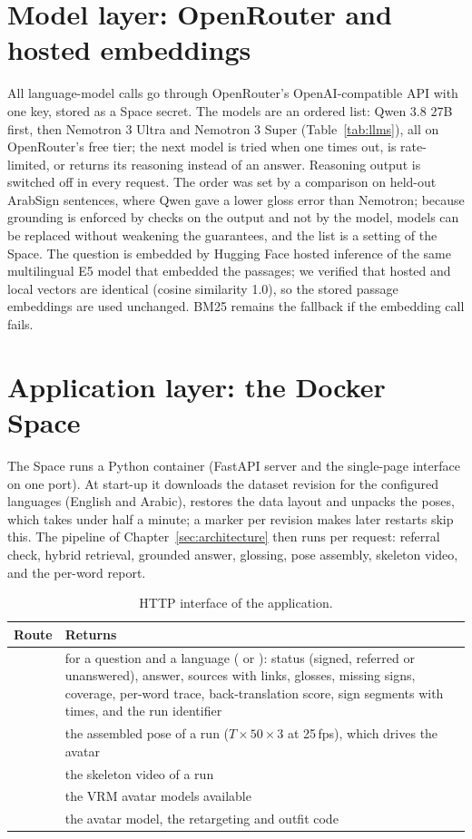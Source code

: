 \section{Model layer: OpenRouter and hosted embeddings}
All language-model calls go through OpenRouter's OpenAI-compatible API with one key, stored as a Space secret. The models
are an ordered list: Qwen 3.8 27B first, then Nemotron 3 Ultra and Nemotron 3 Super (Table~\ref{tab:llms}), all on
OpenRouter's free tier; the next model is tried when one times out, is rate-limited, or returns its reasoning instead of an
answer. Reasoning output is switched off in every request. The order was set by a comparison on held-out ArabSign
sentences, where Qwen gave a lower gloss error than Nemotron; because grounding is enforced by checks on the output and not
by the model, models can be replaced without weakening the guarantees, and the list is a setting of the Space. The question
is embedded by Hugging Face hosted inference of the same multilingual E5 model that embedded the passages; we verified that
hosted and local vectors are identical (cosine similarity 1.0), so the stored passage embeddings are used unchanged. BM25
remains the fallback if the embedding call fails.

\section{Application layer: the Docker Space}
The Space runs a Python container (FastAPI server and the single-page interface on one port). At start-up it downloads the
dataset revision for the configured languages (English and Arabic), restores the data layout and unpacks the poses, which
takes under half a minute; a marker per revision makes later restarts skip this. The pipeline of
Chapter~\ref{sec:architecture} then runs per request: referral check, hybrid retrieval, grounded answer, glossing, pose
assembly, skeleton video, and the per-word report.

\begin{table}[ht]
\centering\small
\caption{HTTP interface of the application.}
\label{tab:api}
\begin{tabularx}{\textwidth}{L{3.6cm} Y}
\toprule
Route & Returns \\
\midrule
{} & for a question and a language ( or ): status (signed, referred or unanswered),
answer, sources with links, glosses, missing signs, coverage, per-word trace, back-translation score, sign segments with
times, and the run identifier \\
 & the assembled pose of a run ($T\times 50\times 3$ at 25\,fps), which drives the avatar \\
 & the skeleton video of a run \\
 & the VRM avatar models available \\
 & the avatar model, the retargeting and outfit code \\
\bottomrule
\end{tabularx}
\end{table}

